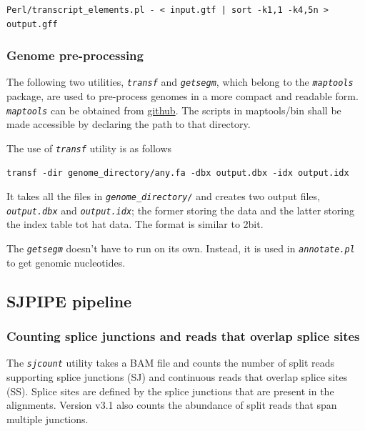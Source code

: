 \documentclass{article}
\newcommand{\prog}[1]{{\tt\em #1}}
\begin{document}
\begin{verbatim} 
Perl/transcript_elements.pl - < input.gtf | sort -k1,1 -k4,5n > output.gff
\end{verbatim}


\subsubsection{Genome pre-processing}
The following two utilities, \prog{transf} and \prog{getsegm}, which belong to the \prog{maptools} package, are used to pre-process genomes in a more compact and
readable form. \prog{maptools} can be obtained from \href{https://github.com/pervouchine/maptools}{github}. The scripts in maptools/bin shall be made accessible
by declaring the path to that directory.

The use of \prog{transf} utility is as follows
\begin{verbatim} 
transf -dir genome_directory/any.fa -dbx output.dbx -idx output.idx
\end{verbatim}

It takes all the files in \prog{genome\_directory/} and creates two output files, \prog{output.dbx} and \prog{output.idx}; the former storing the data and the latter 
storing the index table tot hat data. The format is similar to 2bit. 

The \prog{getsegm} doesn't have to run on its own. Instead, it is used in \prog{annotate.pl} to get genomic nucleotides.



\subsection{SJPIPE pipeline}

\subsubsection{Counting splice junctions and reads that overlap splice sites}
The \prog{sjcount} utility takes a  BAM file and counts the number of split reads supporting splice junctions (SJ) and continuous reads 
that overlap splice sites (SS). Splice sites are defined by the splice junctions that are present in the alignments.
Version v3.1 also counts the abundance of split reads that span multiple junctions.
\end{document}
